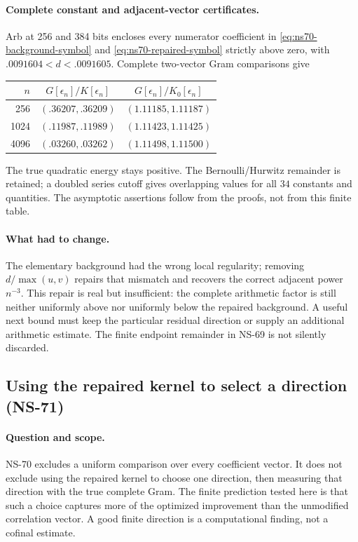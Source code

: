 \documentclass[11pt]{article}
\theoremstyle{remark}
\begin{document}
\paragraph{Complete constant and adjacent-vector certificates.}
Arb at 256 and 384 bits encloses every numerator coefficient in
\eqref{eq:ns70-background-symbol} and
\eqref{eq:ns70-repaired-symbol} strictly above zero, with
$.0091604<d<.0091605$. Complete two-vector Gram comparisons give
\begin{center}\small
\begin{tabular}{rcc}
\toprule
$n$ & $G[\epsilon_n]/K[\epsilon_n]$
    & $G[\epsilon_n]/K_0[\epsilon_n]$\\
\midrule
256 & $(.36207,.36209)$ & $(1.11185,1.11187)$\\
1024 & $(.11987,.11989)$ & $(1.11423,1.11425)$\\
4096 & $(.03260,.03262)$ & $(1.11498,1.11500)$\\
\bottomrule
\end{tabular}\end{center}
The true quadratic energy stays positive. The Bernoulli/Hurwitz
remainder is retained; a doubled series cutoff gives overlapping
values for all $34$ constants and quantities. The asymptotic assertions
follow from the proofs, not from this finite table.

\paragraph{What had to change.}
The elementary background had the wrong local regularity; removing
$d/\max(u,v)$ repairs that mismatch and recovers the correct adjacent
power $n^{-3}$. This repair is real but insufficient: the complete
arithmetic factor is still neither uniformly above nor uniformly below
the repaired background. A useful next bound must keep the particular
residual direction or supply an additional arithmetic estimate. The
finite endpoint remainder in NS-69 is not silently discarded.

\subsection{Using the repaired kernel to select a direction (NS-71)}
\label{sec:ns71-selected-preconditioner}

\paragraph{Question and scope.}
NS-70 excludes a uniform comparison over every coefficient vector.
It does not exclude using the repaired kernel to choose one direction,
then measuring that direction with the true complete Gram. The finite
prediction tested here is that such a choice captures more of the
optimized improvement than the unmodified correlation vector. A good
finite direction is a computational finding, not a cofinal estimate.
\end{document}
